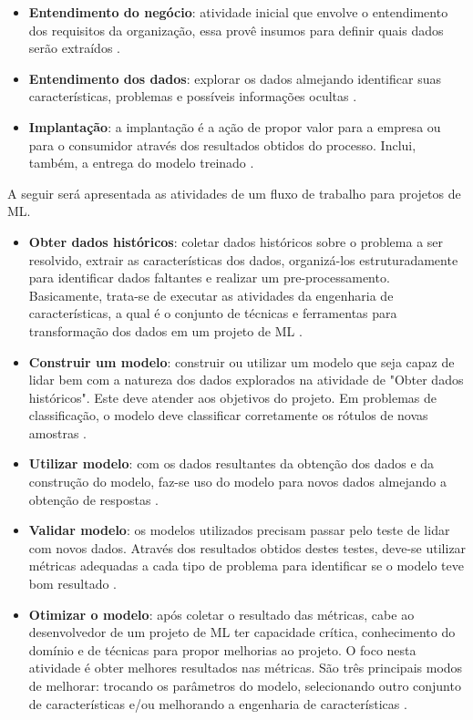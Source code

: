 \begin{itemize}
	\item \textbf{Entendimento do negócio}: atividade inicial que envolve o entendimento dos requisitos da organização, essa provê insumos para definir quais dados serão extraídos \cite{CHAPMAN2000}. 
    \item \textbf{Entendimento dos dados}: explorar os dados almejando identificar suas características, problemas e possíveis informações ocultas \cite{CHAPMAN2000}.
    \item \textbf{Implantação}: a implantação é a ação de propor valor para a empresa ou para o consumidor através dos resultados obtidos do processo. Inclui, também, a entrega do modelo treinado \cite{CHAPMAN2000}.
\end{itemize}

A seguir será apresentada as atividades de um fluxo de trabalho para projetos de ML.

\begin{itemize}
	\item \textbf{Obter dados históricos}: coletar dados históricos sobre o problema a ser resolvido, extrair as características dos dados, organizá-los estruturadamente para identificar dados faltantes e realizar um pre-processamento. Basicamente, trata-se de executar as atividades da engenharia de características, a qual é o conjunto de técnicas e ferramentas para transformação dos dados em um projeto de ML \cite{BRINK2015}.
    \item \textbf{Construir um modelo}: construir ou utilizar um modelo que seja capaz de lidar bem com a natureza dos dados explorados na atividade de "Obter dados históricos". Este deve atender aos objetivos do projeto. Em problemas de classificação, o modelo deve classificar corretamente os rótulos de novas amostras \cite{BRINK2015}.
    \item \textbf{Utilizar modelo}: com os dados resultantes da obtenção dos dados e da construção do modelo, faz-se uso do modelo para novos dados almejando a obtenção de respostas \cite{BRINK2015}.
    \item \textbf{Validar modelo}: os modelos utilizados precisam passar pelo teste de lidar com novos dados. Através dos resultados obtidos destes testes, deve-se utilizar métricas adequadas a cada tipo de problema para identificar se o modelo teve bom resultado \cite{BRINK2015}.
    \item \textbf{Otimizar o modelo}: após coletar o resultado das métricas, cabe ao desenvolvedor de um projeto de ML ter capacidade crítica, conhecimento do domínio e de técnicas para propor melhorias ao projeto. O foco nesta atividade é obter melhores resultados nas métricas. São três principais modos de melhorar: trocando os parâmetros do modelo, selecionando outro conjunto de características e/ou melhorando a engenharia de características \cite{BRINK2015}.
\end{itemize}

